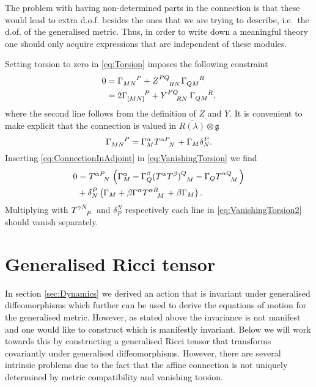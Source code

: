 The problem with having non-determined parts in the connection is that these would lead to extra d.o.f. besides the ones that we are trying to describe, i.e.\ the d.of. of the generalised metric. Thus, in order to write down a meaningful theory one should only acquire expressions that are independent of these modules.

Setting torsion to zero in \eqref{eq:Torsion} imposes the following constraint 
\begin{equation}\label{eq:VanishingTorsion}
    \begin{aligned}
        0 &= \tensor{\Gamma}{_{MN}^P} +\tensor{Z}{^{PQ}_{RN}}\tensor{\Gamma}{_{QM}^R}\\
          &= 2\tensor{\Gamma}{_{[MN]}^P} +\tensor{Y}{^{PQ}_{RN}}\tensor{\Gamma}{_{QM}^R},
    \end{aligned}
\end{equation}
where the second line follows from the definition of $Z$ and $Y$. It is convenient to make explicit that the connection is valued in $\overbar{R(\lambda)}\otimes\mathfrak{g}$
\begin{equation}\label{eq:ConnectionInAdjoint}
    \tensor{\Gamma}{_{MN}^P} = \Gamma_M^\alpha\tensor{T}{^\alpha ^P_N}+\Gamma_M\delta^P_N.
\end{equation}
Inserting \eqref{eq:ConnectionInAdjoint} in \eqref{eq:VanishingTorsion} we find 
\begin{equation}\label{eq:VanishingTorsion2}
    \begin{aligned}
    0 &= \tensor{T}{^{\alpha P}_N}\left(\Gamma_M^\alpha-\Gamma_Q^\beta(T^\alpha T^\beta)\tensor{}{^Q_M}-\Gamma_Q\tensor{T}{^{\alpha Q}_M}\right)\\
    &+ \delta^P_N\left(\Gamma_M+\beta\Gamma^\alpha\tensor{T}{^{\alpha R}_M}+\beta\Gamma_M\right).
    \end{aligned}
\end{equation}
Multiplying with $\tensor{T}{^{\gamma N}_P}$ and $\delta^N_P$ respectively each line in \eqref{eq:VanishingTorsion2} should vanish separately.



\section{Generalised Ricci tensor}
In section \ref{sec:Dynamics} we derived an action that is invariant under generalised diffeomorphisms which further can be used to derive the equations of motion for the generalised metric. However, as stated above the invariance is not manifest and one would like to construct which is manifestly invariant. Below we will work towards this by constructing a generalised Ricci tensor that transforms covariantly under generalised diffeomorphisms. However, there are several intrinsic problems due to the fact that the affine connection is not uniquely determined by metric compatibility and vanishing torsion. 

